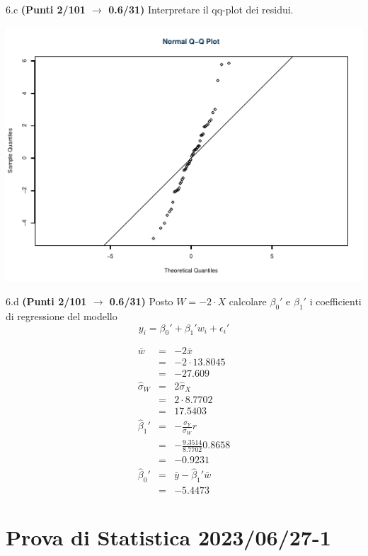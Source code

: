 \documentclass[
  11pt,
]{book}
\theoremstyle{mytheoremstyle}
\theoremstyle{mydefstyle}
\newenvironment{sol}
  {
  \begin{tcolorbox}[enhanced,breakable,arc=0.1mm,boxrule=1pt,colback=white,colframe=iblue,
  title=\bf \fontfamily{lmss}\selectfont \hspace{.5 cm} Soluzione,drop fuzzy shadow]

}{
\end{tcolorbox}
  }
\begin{document}
6.c \textbf{(Punti 2/101 \(\rightarrow\) 0.6/31)} Interpretare il qq-plot dei residui.

\begin{center}\includegraphics{Esami_passati_con_soluzioni_files/figure-latex/2023-56,-1} \end{center}

6.d \textbf{(Punti 2/101 \(\rightarrow\) 0.6/31)} Posto \(W=-2\cdot X\) calcolare \(\beta_0'\) e \(\beta_1'\) i coefficienti di regressione del modello
\[
y_i = \beta_0'+\beta_1'w_i+\epsilon_i'
\]

\begin{sol}
\begin{eqnarray*}
  \bar w &=&  -2\bar x\\
  &=& -2\cdot13.8045\\
  &=& -27.609\\
  \hat\sigma_W&=&2\hat\sigma_X\\
  &=& 2\cdot8.7702\\
  &=& 17.5403\\
  \hat\beta_1' &=& -\frac{\sigma_Y}{\sigma_W}r\\
  &=& -\frac{9.3514}{8.7702}0.8658\\
  &=& -0.9231\\
  \hat\beta_0'&=& \bar y - \hat\beta_1'\bar w\\
  &=& -5.4473
\end{eqnarray*}

\end{sol}

\section{Prova di Statistica 2023/06/27-1}\label{prova-di-statistica-20230627-1}
\end{document}
